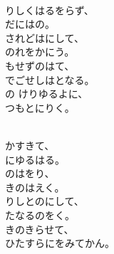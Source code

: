 \documentclass[10pt,b5j]{tarticle} %
\begin{document}
\vspace{1.5em} %
\newcommand{\linespace}{0.5em} %
\newcommand{\blocksize}{0.5\hsize} %
\newcommand{\itemmargin}{3em} %
\begin{enumerate} %
    \setlength{\itemindent}{\itemmargin} %
    \begin{minipage}[c]{\blocksize}
    
        \vspace{\linespace}
        \item~\\
        りしくはるをらず、\\
        だにはの。\\
        されどはにして、\\
        のれをかにう。\\
        もせずのはて、\\
        でごせしはとなる。\\
        の けりゆるよに、\\
        つもとにりく。
        
    \end{minipage}
    \begin{minipage}[c]{\blocksize}
        
        \vspace{\linespace}
        \item~\\
        かすきて、\\
        にゆるはる。\\
        のはをり、\\
        きのはえく。\\
        りしとのにして、\\
        たなるのをく。\\
        きのきらせて、\\
        ひたすらにをみてかん。
    
    \end{minipage}
\end{enumerate} %
\end{document}
